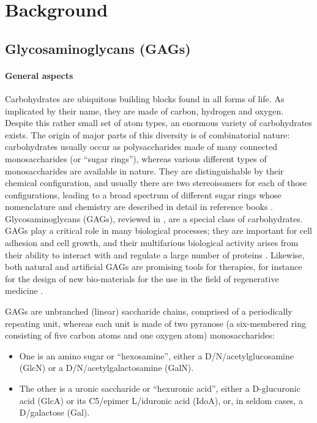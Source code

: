 \chapter{Background}
\label{background}

\section{Glycosaminoglycans (GAGs)}
\label{background:gags}


\subsubsection{General aspects}%
Carbohydrates are ubiquitous building blocks found in all forms of life. As
implicated by their name, they are made of carbon, hydrogen and oxygen. Despite
this rather small set of atom types, an enormous variety of carbohydrates
exists. The origin of major parts of this diversity is of combinatorial nature:
carbohydrates usually occur as polysaccharides made of many connected
monosaccharides (or \enquote{sugar rings}), whereas various different types of
monosaccharides are available in nature. They are distinguishable by their
chemical configuration, and usually there are two stereoisomers for each of
those configurations, leading to a broad spectrum of different sugar rings whose
nomenclature and chemistry are described in detail in reference books
\cite{carbohydrate_chemistry_robyt_1998, carbohydrate_chemistry_royal_2000}.
Glycosaminoglycans (GAGs), reviewed in
\cite{essentials_glycobiology_gags_chapter_2009}, are a special class of
carbohydrates. GAGs play a critical role in many biological processes; they are
important for cell adhesion and cell growth, and their multifarious biological
activity arises from their ability to interact with and regulate a large number
of proteins \cite{handel_2005,gandhi_structure_2008}. Likewise, both natural and
artificial GAGs are promising tools for therapies, for instance for the design
of new bio-materials for the use in the field of regenerative medicine
\cite{whitelock_2014,schnabelrauch_tissues_2013,scott_gags_therapies_2013}.

GAGs are unbranched (linear) saccharide chains, comprised of a periodically
repeating unit, whereas each unit is made of two pyranose (a six-membered ring
consisting of five carbon atoms and one oxygen atom) monosaccharides:


\begin{itemize}
\item One is an amino sugar or \enquote{hexosamine}, either a
D\-/N\-/acetylglucosamine (GlcN) or a D\-/N\-/acetylgalactosamine (GalN).
\item The other is a uronic saccharide or \enquote{hexuronic acid}, either a
D-glucuronic acid (GlcA) or its C5\-/epimer L\-/iduronic acid (IdoA), or, in
seldom cases, a D\-/galactose (Gal).
\end{itemize}


